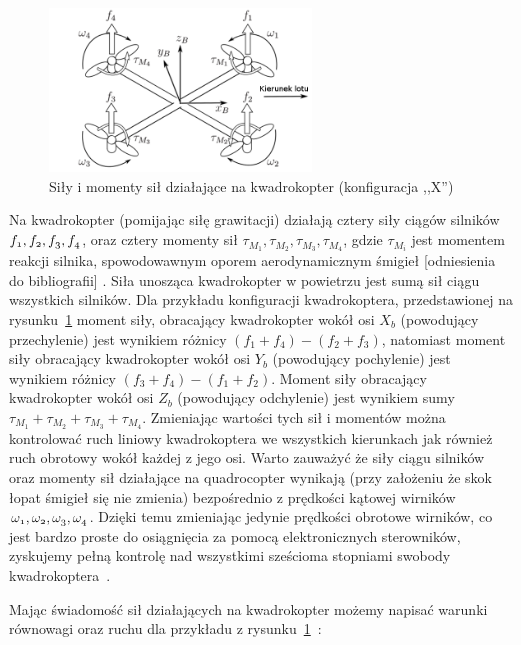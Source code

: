 \begin{figure}[H]
	\centering
		\includegraphics[width=0.62\textwidth]{Pictures/quadrotor_forces.png}
		\caption[Siły i momenty sił działające na kwadrokopter]{Siły i momenty sił działające na kwadrokopter (konfiguracja ,,X'')~\cite{quadro7}}
	\label{fig:quadrotor_forces}
\end{figure}


Na kwadrokopter (pomijając siłę grawitacji) działają cztery siły ciągów silników $\mathnormal{f_1, f_2, f_3, f_4}$, oraz cztery momenty sił $\tau_{M_1}, \tau_{M_2}, \tau_{M_3}, \tau_{M_4}$, gdzie $\tau_{M_i}$ jest momentem reakcji silnika, spowodowawnym oporem aerodynamicznym śmigieł [odniesienia do bibliografii] . 
Siła unosząca kwadrokopter w powietrzu jest sumą sił ciągu wszystkich silników. Dla przykładu konfiguracji kwadrokoptera, przedstawionej na rysunku~\ref{fig:quadrotor_forces} moment siły, obracający kwadrokopter wokół osi $X_b$ (powodujący przechylenie) jest wynikiem różnicy $(f_1 + f_4) - (f_2 + f_3)$, natomiast moment siły obracający kwadrokopter wokół osi $Y_b$ (powodujący pochylenie) jest wynikiem różnicy $(f_3 + f_4) - (f_1 + f_2)$. 
Moment siły obracający kwadrokopter wokół osi $Z_b$ (powodujący odchylenie) jest wynikiem sumy $\tau_{M_1} + \tau_{M_2} + \tau_{M_3} + \tau_{M_4}$.  Zmieniając wartości tych sił i momentów można kontrolować ruch liniowy kwadrokoptera we wszystkich kierunkach jak również ruch obrotowy wokół każdej z jego osi. Warto zauważyć że siły ciągu silników oraz momenty sił działające na quadrocopter wynikają (przy założeniu że skok łopat śmigieł się nie zmienia) bezpośrednio z prędkości kątowej wirników $\mathnormal{\omega_1, \omega_2, \omega_3, \omega_4}$. Dzięki temu zmieniając jedynie prędkości obrotowe wirników, co jest bardzo proste do osiągnięcia za pomocą elektronicznych sterowników, zyskujemy pełną kontrolę nad wszystkimi sześcioma stopniami swobody kwadrokoptera~\cite{quadro8}.  

Mając świadomość sił działających na kwadrokopter możemy napisać warunki równowagi oraz ruchu dla przykładu z rysunku~\ref{fig:quadrotor_forces}~\cite{quadro8, quadro9}:

